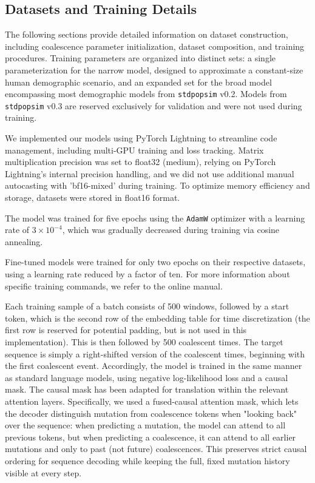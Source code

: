 \documentclass[9pt,twoside]{pnas-new}
\newcommand{\stdpopsim}{\texttt{stdpopsim}\xspace}
\begin{document}
\subsection*{Datasets and Training Details}

The following sections provide detailed information on dataset construction, including coalescence parameter initialization, dataset composition, and training procedures. 
Training parameters are organized into distinct sets: a single parameterization for the narrow model, designed to approximate a constant-size human demographic scenario, and an expanded set for the broad model encompassing most demographic models from \stdpopsim v0.2. 
Models from \stdpopsim v0.3 are reserved exclusively for validation and were not used during training.


We implemented our models using PyTorch Lightning to streamline code management,
including multi-GPU training and loss tracking. 
Matrix multiplication precision was set to float32 (medium), 
relying on PyTorch Lightning's internal precision handling, 
and we did not use additional manual autocasting with 'bf16-mixed' during training. 
To optimize memory efficiency and storage, datasets were stored in float16 format.

The model was trained for five epochs using the \texttt{AdamW} optimizer with a learning rate of $3\times10^{-4}$,
which was gradually decreased during training via cosine annealing.

Fine-tuned models were trained for only two epochs on their respective datasets, using a learning rate reduced by a factor of ten. For more information about specific training commands, we refer to the online manual.

Each training sample of a batch consists of 500 windows, followed by a start token, 
which is the second row of the embedding table for time discretization 
(the first row is reserved for potential padding, but is not used in this implementation).
This is then followed by 500 coalescent times. The target sequence is simply a right-shifted version of the coalescent times, beginning with the first coalescent event.
Accordingly, the model is trained in the same manner as standard language models, using negative log-likelihood loss and a causal mask. The causal mask has been adapted for translation within the relevant attention layers. Specifically, we used a fused-causal attention mask, which lets the decoder distinguish mutation from coalescence tokens when "looking back" over the sequence: when predicting a mutation, the model can attend to all previous tokens, but when predicting a coalescence, it can attend to all earlier mutations and only to past (not future) coalescences. This preserves strict causal ordering for sequence decoding while keeping the full, fixed mutation history visible at every step.
\end{document}
